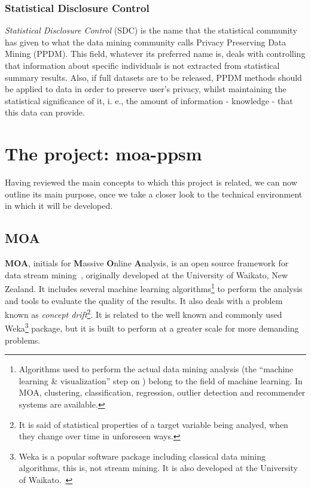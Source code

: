 \subsubsection{Statistical Disclosure Control}

\textit{Statistical Disclosure Control} (SDC) is the name that the statistical community
has given to what the data mining community calls Privacy Preserving Data Mining (PPDM).
This field, whatever its preferred name is, deals with controlling that information about
specific individuals is not extracted from statistical summary results. Also, if full
datasets are to be released, PPDM methods should be applied to data in order to preserve
user's privacy, whilst maintaining the statistical significance of it, i. e., the amount
of information - knowledge - that this data can provide.

\section{The project: moa-ppsm}
\label{Introduction::moa-ppsm}

Having reviewed the main concepts to which this project is related, we can now outline
its main purpose, once we take a closer look to the technical environment in which it
will be developed.

\subsection{MOA}
\label{Introduction::moa-ppsm::MOA}

\textbf{MOA}, initials for \textbf{M}assive \textbf{O}nline \textbf{A}nalysis, is an
open source framework for data stream mining~\citep{web:MOA}, originally
developed at the University of Waikato, New Zealand. It includes several machine learning
algorithms\footnote{Algorithms used to perform the actual data mining analysis (the
“machine learning \& visualization” step on ) belong to the
field of machine learning. In MOA, clustering, classification, regression, outlier
detection and recommender systems are available.} to perform the analysis and tools
to evaluate the quality of the results. It also deals with a problem known as
\textit{concept drift}\footnote{It is said of statistical properties of a target variable
being analyed, when they change over time in unforeseen ways.}. It is related to the well
known and commonly used Weka\footnote{Weka is a popular software package including
classical data mining algorithms, this is, not stream mining. It is also developed at
the University of Waikato.~\citep{web:Weka}} package, but it is built to perform at
a greater scale for more demanding problems.

